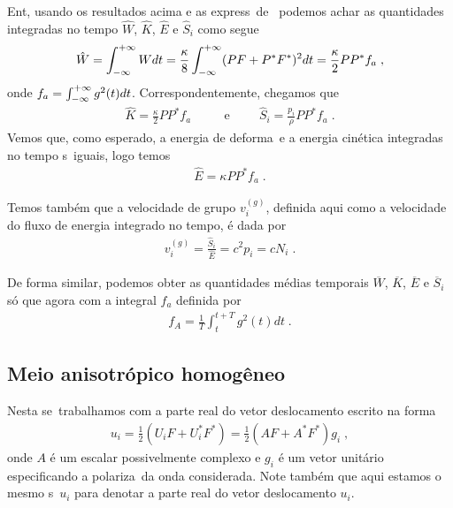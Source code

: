 Ent\ao, usando os resultados acima e as express\oes\
de \, podemos achar as
quantidades integradas no tempo $\hat{W}$, $\hat{K}$,
$\hat{E}$ e $\hat{S}_i$ como segue
\begin{eqnarray}
\hat{W} = \int_{-\infty}^{+\infty} W dt = \frac{\kappa}{8}
\int_{-\infty}^{+\infty}(PF + P^{*}F^{*})^2 dt =
\frac{\kappa}{2} P P^{*} f_a \; ,
\end{eqnarray}
onde $f_a = \int_{-\infty}^{+\infty} g^2(t) dt$. Correspondentemente,
chegamos que 
\begin{eqnarray}
\hat{K} = \frac{\kappa}{2} P P^{*} f_a \;
\hspace{1cm}\mbox{e} \hspace{1cm}
\hat{S}_i = \frac{p_i}{\rho}
 P P^{*} f_a \; .
\end{eqnarray} 
Vemos que, como esperado, a energia de deforma\cao\
e a energia cin\'etica integradas no tempo s\ao\
iguais, logo temos
\begin{eqnarray}
\hat{E} = \kappa P P^{*} f_a \; .
\end{eqnarray}

Temos tamb\'em que a velocidade de grupo $v_i^{(g)}$,
definida aqui como a velocidade do fluxo de energia
integrado no tempo, \'e dada por
\begin{eqnarray}
v_i^{(g)} = \frac{\hat{S}_i}{\hat{E}} = c^2 p_i
= c N_i \; .
\end{eqnarray}

De forma similar, podemos obter as quantidades
m\'edias temporais $\overline{W}$, $\overline{K}$,
$\overline{E}$ e $\overline{S}_i$ s\'o que agora
com a integral $f_a$ definida por
\begin{eqnarray}
f_A = \frac{1}{T} \int_{t}^{t+T} g^2(t) dt \; .
\end{eqnarray}


\subsection{Meio anisotr\'opico homog\^eneo}

Nesta se\cao\ trabalhamos com a parte real do vetor
deslocamento escrito na forma
\begin{eqnarray}
u_i = \frac{1}{2}(U_iF + U_i^{*}F^{*}) = 
\frac{1}{2} (AF + A^{*}F^{*}) g_i \; ,
\end{eqnarray}
onde $A$ \'e um escalar possivelmente complexo e
$g_i$ \'e um vetor unit\'ario especificando a
polariza\cao\ da onda considerada. Note tamb\'em
que aqui estamos o mesmo s\imbolo\ $u_i$ para
denotar a parte real do vetor deslocamento $u_i$.

